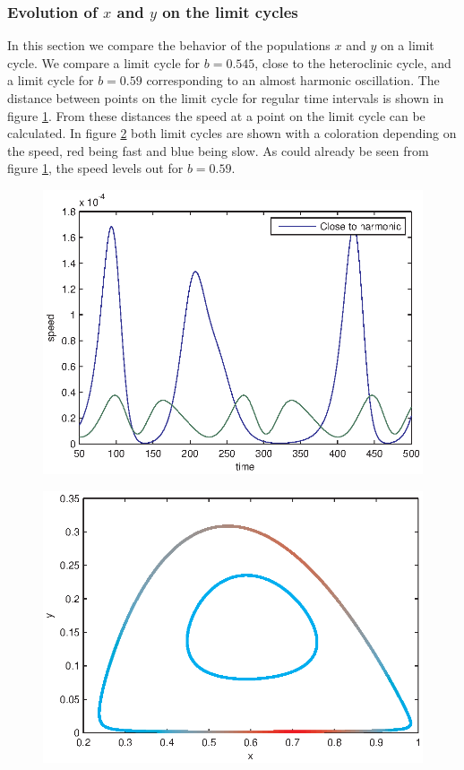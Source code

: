 \subsubsection{Evolution of $x$ and $y$ on the limit cycles}
In this section we compare the behavior of the populations $x$ and $y$ on a limit cycle. We compare a limit cycle for $b=0.545$, close to the heteroclinic cycle, and a limit cycle for $b=0.59$ corresponding to an almost harmonic oscillation. The distance between points on the limit cycle for regular time intervals is shown in figure \ref{fig:ex3speeds}. From these distances the speed at a point on the limit cycle can be calculated. In figure \ref{fig:ex3coloredorbits} both limit cycles are shown with a coloration depending on the speed, red being fast and blue being slow. As could already be seen from figure \ref{fig:ex3speeds}, the speed levels out for $b=0.59$.
\begin{figure}[htp]
\centering
\includegraphics{img/ex3/speeds.eps}
\caption{}
\label{fig:ex3speeds}
\end{figure}
\begin{figure}[htp]
\centering
\includegraphics{img/ex3/coloredorbits.eps}
\caption{}
\label{fig:ex3coloredorbits}
\end{figure}
